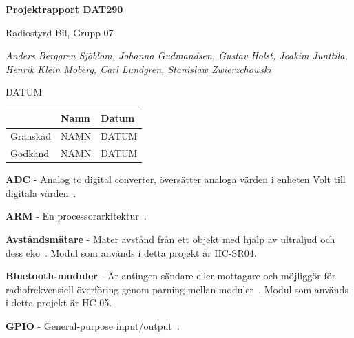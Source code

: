 \documentclass[a4paper]{article}
\begin{document}
\begin{titlepage}
\centering
{\bfseries\huge Projektrapport DAT290}

\vspace{10mm}

{\Large Radiostyrd Bil, Grupp 07}

\vspace{20mm}

{\Large \itshape{Anders Berggren Sjöblom, Johanna Gudmandsen, Gustav Holst, Joakim Junttila, Henrik Klein Moberg, Carl Lundgren, Stanisław Zwierzchowski}}

\vspace{10mm}

{DATUM}


\normalsize{
\begin{table}[b]
\centering
\begin{tabular}{|l|l|l|}  \hline
         & \bf Namn & \bf Datum   \\ \hline \hline
Granskad & NAMN     & DATUM        \\ \hline
Godkänd  & NAMN     & DATUM         \\ \hline
\end{tabular} 
\end{table}}
\end{titlepage}

\tableofcontents

\newpage
{}


\vspace{5mm} \noindent
{\bf ADC} - Analog to digital converter, översätter analoga värden i enheten Volt till digitala värden~\cite{ADC}.

\vspace{5mm} \noindent
{\bf ARM} - En processorarkitektur~\cite{chalmersARM}.

\vspace{5mm} \noindent
{\bf Avståndsmätare} - Mäter avstånd från ett objekt med hjälp av ultraljud och dess eko~\cite{DistMeasure}. Modul som används i detta projekt är HC-SR04.

\vspace{5mm} \noindent
{\bf Bluetooth-moduler} - Är antingen sändare eller mottagare och möjliggör för radiofrekvensiell överföring genom parning mellan moduler~\cite{Bluetooth}. Modul som används i detta projekt är HC-05.

\vspace{5mm} \noindent
{\bf GPIO} - General-purpose input/output~\cite{chalmersARM}.
\end{document}
